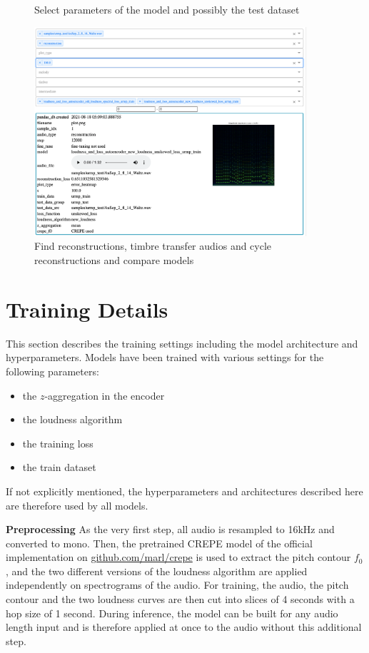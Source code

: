 \begin{theappendices}
\begin{figure}
        \caption{Select parameters of the model and possibly the test dataset}
        \label{fig:screen1}
    \end{figure}
    
    \begin{figure}
        \includegraphics[width=0.9\textwidth]{figures/dashboard/screen2.png}
        \caption{Find reconstructions, timbre transfer audios and cycle reconstructions and compare models}
        \label{fig:screen2}
    \end{figure}

    


\chapter{Training Details}
\label{appendix:trainingdetails}
This section describes the training settings including the model architecture and hyperparameters.
Models have been trained with various settings for the following parameters:
\begin{itemize}
    \item the $z$-aggregation in the encoder
    \item the loudness algorithm
    \item the training loss
    \item the train dataset
\end{itemize}
If not explicitly mentioned, the hyperparameters and architectures described here are therefore used by all models. \newline

\textbf{Preprocessing}
As the very first step, all audio is resampled to 16kHz and converted to mono.
Then, the pretrained CREPE model \citep{kim_crepe_2018} of the official implementation on \href{https://github.com/marl/crepe}{github.com/marl/crepe} is used to extract the pitch contour $f_0$, and the two different versions of the loudness algorithm are applied independently on spectrograms of the audio.
For training, the audio, the pitch contour and the two loudness curves are then cut into slices of 4 seconds with a hop size of 1 second.
During inference, the model can be built for any audio length input and is therefore applied at once to the audio without this additional step.



\end{theappendices}
